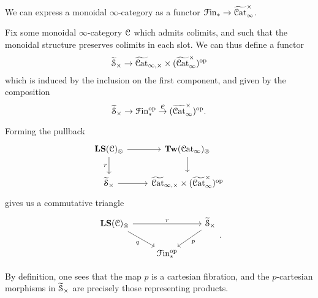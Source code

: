 \documentclass[main.tex]{subfiles}
\begin{document}
\begin{proposition}
  We can express a monoidal $\infty$-category as a functor $\mathcal{F}\mathrm{in}_{*} \to \widetilde{\mathcal{C}\mathrm{at}}_{\infty}^{\times}$.
\end{proposition}

Fix some monoidal $\infty$-category $\mathcal{C}$ which admits colimits, and such that the monoidal structure preserves colimits in each slot. We can thus define a functor
\begin{equation*}
  \widetilde{\mathcal{S}}_{\times} \to \widetilde{\mathcal{C}\mathrm{at}}_{\infty,\times} \times (\widetilde{\mathcal{C}\mathrm{at}}_{\infty}^{\times})^{\mathrm{op}}
\end{equation*}
which is induced by the inclusion on the first component, and given by the composition
\begin{equation*}
  \widetilde{\mathcal{S}}_{\times} \to \mathcal{F}\mathrm{in}_{*}^{\mathrm{op}} \overset{\mathcal{C}}{\to} (\widetilde{\mathcal{C}\mathrm{at}}_{\infty}^{\times})^{\mathrm{op}}.
\end{equation*}

Forming the pullback
\begin{equation*}
  \begin{tikzcd}
    \LS(\category{C})_{\otimes}
    \arrow[r]
    \arrow[d, swap, "r"]
    & \Tw(\ICat)_{\otimes}
    \arrow[d]
    \\
    \TSCart
    \arrow[r]
    & \TICatCart \times (\TICatCocart)\op
  \end{tikzcd}
\end{equation*}
gives us a commutative triangle
\begin{equation*}
  \begin{tikzcd}
    \LS(\category{C})_{\otimes}
    \arrow[rr, "r"]
    \arrow[dr, swap, "q"]
    && \TSCart
    \arrow[dl, "p"]
    \\
    & \Finp\op
  \end{tikzcd}.
\end{equation*}

By definition, one sees that the map $p$ is a cartesian fibration, and the $p$-cartesian morphisms in $\widetilde{\mathcal{S}}_{\times}$ are precisely those representing products.
\end{document}

